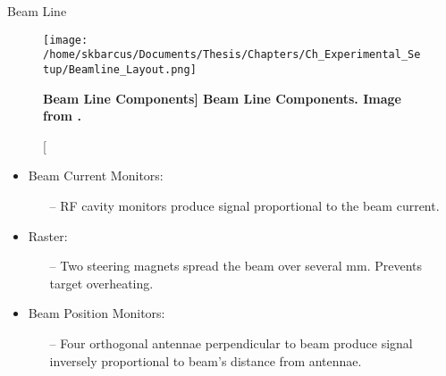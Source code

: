 \documentclass[10pt]{beamer}
\begin{document}
\begin{frame}[fragile]{Beam Line}

	\begin{figure}[!ht]
	\begin{center}
	\texttt{[image: /home/skbarcus/Documents/Thesis/Chapters/Ch\_Experimental\_Setup/Beamline\_Layout.png]}
	\end{center}
	\caption[\bf{Beam Line Components}]{
	{\bf{Beam Line Components.}} Image from \cite{Thesis:Wang}.}
	\label{fig:halla_top}
	\end{figure}
	
	\vspace{-4mm}
	\begin{itemize}
		
		\pause
		\item \alert{B}eam \alert{C}urrent \alert{M}onitors:
		\begin{itemize}
			\item[--] \alert{RF cavity monitors} produce signal proportional to the beam current.
		\end{itemize}
			
		\pause
		\item Raster:
		\begin{itemize}
			\item[--] Two steering magnets spread the beam over several mm. \alert{Prevents target overheating}.
		\end{itemize}
		
		\pause
		\item \alert{B}eam \alert{P}osition \alert{M}onitors:
		\begin{itemize}
			\item[--] \alert{Four orthogonal antennae} perpendicular to beam produce signal inversely proportional to beam’s distance from antennae.
		\end{itemize}

	\end{itemize}
	
\end{frame}
\end{document}
